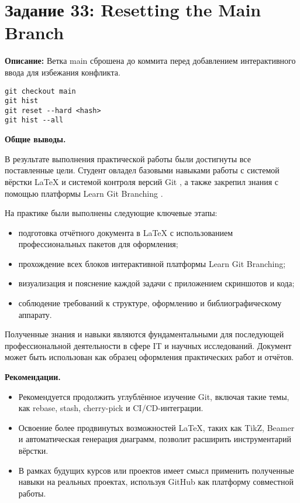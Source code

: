\documentclass[a4paper,12pt]{report}
\begin{document}
\section*{Задание 33: Resetting the Main Branch}
\textbf{Описание:} Ветка main сброшена до коммита перед добавлением интерактивного ввода для избежания конфликта.
\begin{verbatim}
git checkout main
git hist
git reset --hard <hash>
git hist --all
\end{verbatim}




\textbf{Общие выводы.}

В результате выполнения практической работы были достигнуты все поставленные цели. Студент овладел базовыми навыками работы с системой вёрстки \LaTeX{} и системой контроля версий Git \cite{latex_official_doc, progit_book}, а также закрепил знания с помощью платформы Learn Git Branching \cite{learngitbranching}.

На практике были выполнены следующие ключевые этапы:
\begin{itemize}
  \item подготовка отчётного документа в \LaTeX{} с использованием профессиональных пакетов для оформления;
  \item прохождение всех блоков интерактивной платформы Learn Git Branching;
  \item визуализация и пояснение каждой задачи с приложением скриншотов и кода;
  \item соблюдение требований к структуре, оформлению и библиографическому аппарату.
\end{itemize}

Полученные знания и навыки являются фундаментальными для последующей профессиональной деятельности в сфере IT и научных исследований. Документ может быть использован как образец оформления практических работ и отчётов.

\textbf{Рекомендации.}

\begin{itemize}
  \item Рекомендуется продолжить углублённое изучение Git, включая такие темы, как rebase, stash, cherry-pick и CI/CD-интеграции.
  \item Освоение более продвинутых возможностей \LaTeX{}, таких как TikZ, Beamer и автоматическая генерация диаграмм, позволит расширить инструментарий вёрстки.
  \item В рамках будущих курсов или проектов имеет смысл применить полученные навыки на реальных проектах, используя GitHub как платформу совместной работы.
\end{itemize}
\end{document}
